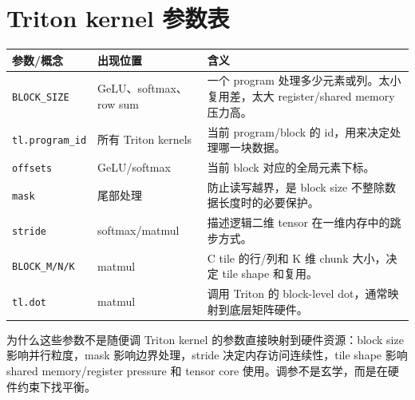 \section{Triton kernel 参数表}

\begin{longtable}{p{}p{}p{}}
\toprule
\textbf{参数/概念} & \textbf{出现位置} & \textbf{含义} \\
\midrule
\texttt{BLOCK\_SIZE} & GeLU、softmax、row sum & 一个 program 处理多少元素或列。太小复用差，太大 register/shared memory 压力高。 \\
\texttt{tl.program\_id} & 所有 Triton kernels & 当前 program/block 的 id，用来决定处理哪一块数据。 \\
\texttt{offsets} & GeLU/softmax & 当前 block 对应的全局元素下标。 \\
\texttt{mask} & 尾部处理 & 防止读写越界，是 block size 不整除数据长度时的必要保护。 \\
\texttt{stride} & softmax/matmul & 描述逻辑二维 tensor 在一维内存中的跳步方式。 \\
\texttt{BLOCK\_M/N/K} & matmul & C tile 的行/列和 K 维 chunk 大小，决定 tile shape 和复用。 \\
\texttt{tl.dot} & matmul & 调用 Triton 的 block-level dot，通常映射到底层矩阵硬件。 \\
\bottomrule
\end{longtable}

\begin{knowledgebox}{为什么这些参数不是随便调}
Triton kernel 的参数直接映射到硬件资源：block size 影响并行粒度，mask 影响边界处理，stride 决定内存访问连续性，tile shape 影响 shared memory/register pressure 和 tensor core 使用。调参不是玄学，而是在硬件约束下找平衡。
\end{knowledgebox}



